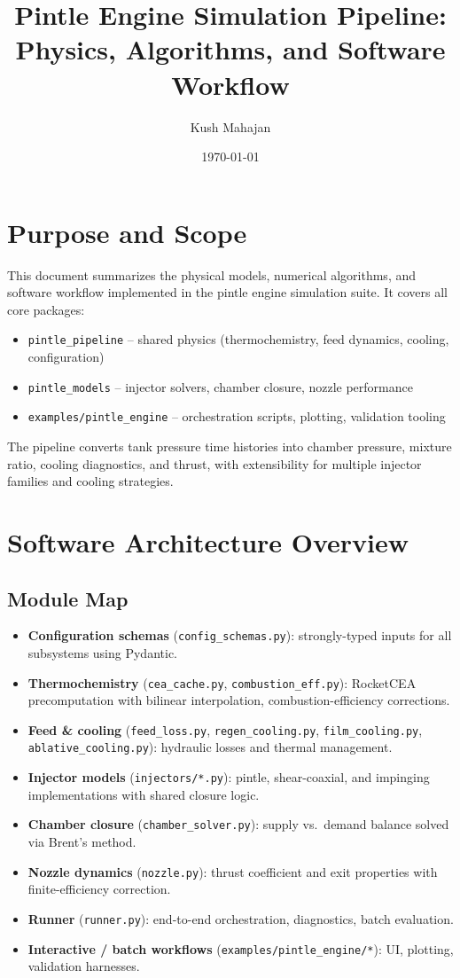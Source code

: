 \documentclass[12pt]{article}
\title{Pintle Engine Simulation Pipeline:\\
Physics, Algorithms, and Software Workflow}
\author{Kush Mahajan}
\date{\today}
\begin{document}
\maketitle
\tableofcontents
\newpage

\section{Purpose and Scope}

This document summarizes the physical models, numerical algorithms, and software workflow implemented in the pintle engine simulation suite.  It covers all core packages:
\begin{itemize}
    \item \verb|pintle_pipeline| -- shared physics (thermochemistry, feed dynamics, cooling, configuration)
    \item \verb|pintle_models| -- injector solvers, chamber closure, nozzle performance
    \item \verb|examples/pintle_engine| -- orchestration scripts, plotting, validation tooling
\end{itemize}
The pipeline converts tank pressure time histories into chamber pressure, mixture ratio, cooling diagnostics, and thrust, with extensibility for multiple injector families and cooling strategies.

\section{Software Architecture Overview}

\subsection{Module Map}
\begin{itemize}
    \item \textbf{Configuration schemas} (\verb|config_schemas.py|): strongly-typed inputs for all subsystems using Pydantic.
    \item \textbf{Thermochemistry} (\verb|cea_cache.py|, \verb|combustion_eff.py|): RocketCEA precomputation with bilinear interpolation, combustion-efficiency corrections.
    \item \textbf{Feed \& cooling} (\verb|feed_loss.py|, \verb|regen_cooling.py|, \verb|film_cooling.py|, \verb|ablative_cooling.py|): hydraulic losses and thermal management.
    \item \textbf{Injector models} (\verb|injectors/*.py|): pintle, shear-coaxial, and impinging implementations with shared closure logic.
    \item \textbf{Chamber closure} (\verb|chamber_solver.py|): supply vs.\ demand balance solved via Brent's method.
    \item \textbf{Nozzle dynamics} (\verb|nozzle.py|): thrust coefficient and exit properties with finite-efficiency correction.
    \item \textbf{Runner} (\verb|runner.py|): end-to-end orchestration, diagnostics, batch evaluation.
    \item \textbf{Interactive / batch workflows} (\verb|examples/pintle_engine/*|): UI, plotting, validation harnesses.
\end{itemize}
\end{document}
